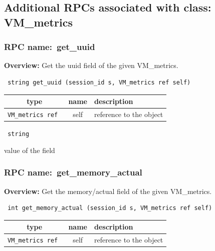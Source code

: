 \subsection{Additional RPCs associated with class: VM\_metrics}
\subsubsection{RPC name:~get\_uuid}

{\bf Overview:} 
Get the uuid field of the given VM\_metrics.

\begin{verbatim} string get_uuid (session_id s, VM_metrics ref self)\end{verbatim}



 
\vspace{0.3cm}
\begin{tabular}{|c|c|p{7cm}|}
 \hline
{\bf type} & {\bf name} & {\bf description} \\ \hline
{\tt VM\_metrics ref } & self & reference to the object \\ \hline 

\end{tabular}

\vspace{0.3cm}

{\tt 
string
}


value of the field
\vspace{0.3cm}
\vspace{0.3cm}
\vspace{0.3cm}
\subsubsection{RPC name:~get\_memory\_actual}

{\bf Overview:} 
Get the memory/actual field of the given VM\_metrics.

\begin{verbatim} int get_memory_actual (session_id s, VM_metrics ref self)\end{verbatim}



 
\vspace{0.3cm}
\begin{tabular}{|c|c|p{7cm}|}
 \hline
{\bf type} & {\bf name} & {\bf description} \\ \hline
{\tt VM\_metrics ref } & self & reference to the object \\ \hline 

\end{tabular}

